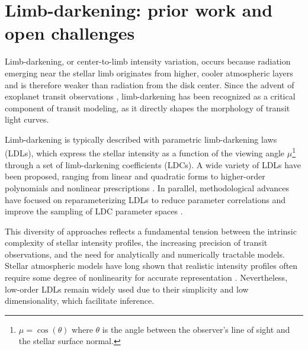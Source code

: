 \documentclass[twocolumn]{aastex631}
\begin{document}
\section{Limb-darkening: prior work and open challenges}\label{sec:LD Context}
Limb-darkening, or center-to-limb intensity variation, occurs because radiation emerging near the stellar limb originates from higher, cooler atmospheric layers and is therefore weaker than radiation from the disk center. Since the advent of exoplanet transit observations \citep{Charbonneau2000,Henry2000}, limb-darkening has been recognized as a critical component of transit modeling, as it directly shapes the morphology of transit light curves.

Limb-darkening is typically described with parametric limb-darkening laws (LDLs), which express the stellar intensity as a function of the viewing angle $\mu$\footnote{$\mu = \cos(\theta)$ where $\theta$ is the angle between the observer’s line of sight and the stellar surface normal.} through a set of limb-darkening coefficients (LDCs). A wide variety of LDLs have been proposed, ranging from linear \citep{Milne1921} and quadratic forms \citep{Manduca1977} to higher-order polynomials \citep{Gimenez2006} and nonlinear prescriptions \citep{Claret2000, Sing2010}. In parallel, methodological advances have focused on reparameterizing LDLs to reduce parameter correlations \citep{Maxted2018,Maxted2023} and improve the sampling of LDC parameter spaces \citep{Kipping2013, Kipping2016}. 

This diversity of approaches reflects a fundamental tension between the intrinsic complexity of stellar intensity profiles, the increasing precision of transit observations, and the need for analytically and numerically tractable models. Stellar atmospheric models have long shown that realistic intensity profiles often require some degree of nonlinearity for accurate representation \citep[e.g.,][]{Claret1998, Neilson2013a, Neilson2013b}. Nevertheless, low-order LDLs remain widely used due to their simplicity and low dimensionality, which facilitate inference. 
\end{document}
